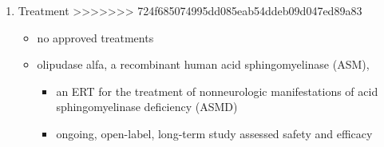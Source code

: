 \documentclass[fontsize=12pt]{scrartcl}
\begin{document}
\begin{enumerate}
\begin{enumerate}
\begin{enumerate}
\begin{enumerate}
\begin{table}[htbp]
\begin{enumerate}
\begin{enumerate}
\begin{table}[htbp]
\begin{enumerate}
\item Treatment
\label{sec:orgf059156}
>>>>>>> 724f685074995dd085eab54ddeb09d047ed89a83
\begin{itemize}
\item no approved treatments
\item olipudase alfa, a recombinant human acid sphingomyelinase (ASM),
\begin{itemize}
\item an ERT for the treatment of nonneurologic manifestations of acid sphingomyelinase deficiency (ASMD)
\item ongoing, open-label, long-term study assessed safety and efficacy
\end{itemize}
\end{itemize}
\end{enumerate}


\end{table}
\end{enumerate}
\end{enumerate}
\end{table}
\end{enumerate}
\end{enumerate}
\end{enumerate}
\end{enumerate}
\end{document}
